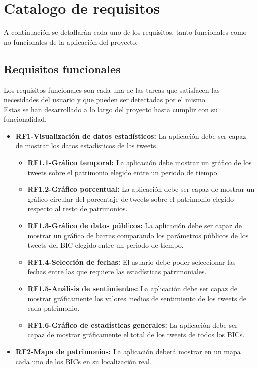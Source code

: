 \section{Catalogo de requisitos}
A continuación se detallarán cada uno de los requisitos, tanto funcionales como no funcionales de la aplicación del proyecto.
\subsection{Requisitos funcionales}
Los requisitos funcionales son cada una de las tareas que satisfacen las necesidades del usuario y que pueden ser detectadas por el mismo. \\
Estas se han desarrollado a lo largo del proyecto hasta cumplir con su funcionalidad.

\begin{itemize}
    \item \textbf{RF1-Visualización de datos estadísticos:} La aplicación debe ser capaz de mostrar los datos estadísticos de los tweets.
    \begin{itemize}
        \item \textbf{RF1.1-Gráfico temporal:} La aplicación debe mostrar un gráfico de los tweets sobre el patrimonio elegido entre un periodo de tiempo.
        \item \textbf{RF1.2-Gráfico porcentual:} La aplicación debe ser capaz de mostrar un gráfico circular del porcentaje de tweets sobre el patrimonio elegido respecto al resto de patrimonios.
        \item \textbf{RF1.3-Gráfico de datos públicos:} La aplicación debe ser capaz de mostrar un gráfico de barras comparando los parámetros públicos de los tweets del BIC elegido entre un periodo de tiempo.
        \item \textbf{RF1.4-Selección de fechas:} El usuario debe poder seleccionar las fechas entre las que requiere las estadísticas patrimoniales.
        \item \textbf{RF1.5-Análisis de sentimientos:} La aplicación debe ser capaz de mostrar gráficamente los valores medios de sentimiento de los tweets de cada patrimonio.
        \item \textbf{RF1.6-Gráfico de estadísticas generales:} La aplicación debe ser capaz de mostrar gráficamente el total de los tweets de todos los BICs.
    \end{itemize}
    \item \textbf{RF2-Mapa de patrimonios:} La aplicación deberá mostrar en un mapa cada uno de los BICs en su localización real.

\end{itemize}
